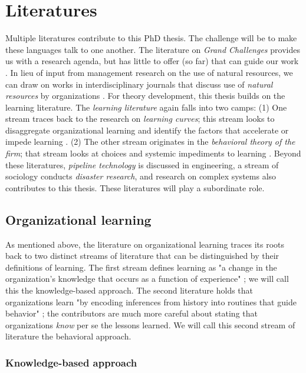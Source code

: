\section{Literatures}

Multiple literatures contribute to this PhD thesis. The challenge will be to make these languages talk to one another. The literature on \textit{Grand Challenges} provides us with a research agenda, but has little to offer (so far) that can guide our work \citep{George2015}. In lieu of input from management research on the use of natural resources, we can draw on works in interdisciplinary journals that discuss use of \textit{natural resources} by organizations \citep[e.g., ][]{Rockstrom2009}. For theory development, this thesis builds on the learning literature. The \textit{learning literature} again falls into two camps: (1) One stream traces back to the research on \textit{learning curves}; this stream looks to disaggregate organizational learning and identify the factors that accelerate or impede learning \citep{Argote2013}. (2) The other stream originates in the \textit{behavioral theory of the firm}; that stream looks at choices and systemic impediments to learning \citep[e.g., ][]{March1963, Levitt1988, Levinthal1993}. Beyond these literatures, \textit{pipeline technology} is discussed in engineering, a stream of sociology conducts \textit{disaster research}, and research on complex systems \citep[especially][]{Perrow1984} also contributes to this thesis. These literatures will play a subordinate role.

\subsection{Organizational learning}

As mentioned above, the literature on organizational learning traces its roots back to two distinct streams of literature that can be distinguished by their definitions of learning. The first stream defines learning as "a change in the organization's knowledge that occurs as a function of experience" \citep[p. 1124]{Argote2011}; we will call this the knowledge-based approach. The second literature holds that organizations learn "by encoding inferences from history into routines that guide behavior" \citep[p. 320]{Levitt1988}; the contributors are much more careful about stating that organizations \textit{know} per se the lessons learned. We will call this second stream of literature the behavioral approach.

\subsubsection{Knowledge-based approach}


